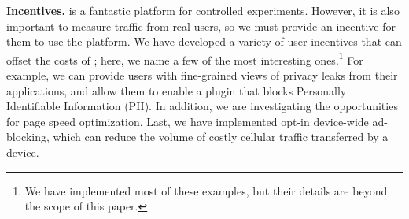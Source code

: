 \noindent\textbf{Incentives.} \platname{} is a fantastic platform for
controlled experiments. However, it is also important to measure
traffic from real users, so we must provide an incentive for them to
use the platform. We have developed a variety of user incentives that
can offset the costs of \platname{}; here, we name a few of the most
interesting ones.\footnote{We have implemented most of these examples,
  but their details are beyond the scope of this paper.} For example,
we can provide users with fine-grained views of privacy leaks from
their applications, and allow them to enable a \platname{} plugin that
blocks Personally Identifiable Information (PII). In addition, we are
investigating the opportunities for page speed optimization. Last, we
have implemented opt-in device-wide ad-blocking, which can reduce the
volume of costly cellular traffic transferred by a device.



